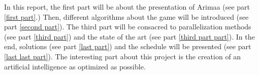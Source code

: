 In this report, the first part will be about the presentation of Arimaa (see part \ref{first part}.) Then, different algorithms about the game will be introduced (see part \ref{second part}). The third part will be consacred to parallelization methods (see part \ref{third part}) and the state of the art (see part \ref{third part part}). In the end, solutions (see part \ref{last part}) and the schedule will be presented (see part \ref{last last part}).
The interesting part about this project is the creation of an artificial intelligence as optimized as possible.
